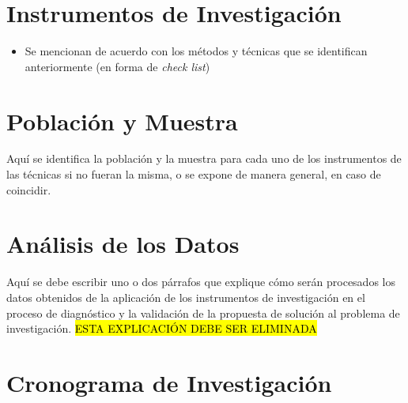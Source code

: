 \section{Instrumentos de Investigaci\'{o}n}
\label{cap2:sec:instrumentos_de_investigacion}

\begin{itemize}
    \item Se mencionan de acuerdo con los m\'{e}todos y t\'{e}cnicas que se identifican anteriormente (en 
forma de \textit{check list}) 
\end{itemize}

\section{Poblaci\'{o}n y Muestra}
\label{cap2:sec:poblacion_y_muestra}

Aqu\'{i} se identifica la poblaci\'{o}n y la muestra para cada uno de los instrumentos de las 
t\'{e}cnicas si no fueran la misma, o se expone de manera general, en caso de coincidir.


\section{An\'{a}lisis de los Datos}
\label{cap2:sec:analisis_de_los_datos}

Aqu\'{i} se debe escribir uno o dos p\'{a}rrafos que explique c\'{o}mo ser\'{a}n procesados los
datos obtenidos de la aplicaci\'{o}n de los instrumentos de investigaci\'{o}n en el proceso de 
diagn\'{o}stico y la validaci\'{o}n de la propuesta de soluci\'{o}n al problema de 
investigaci\'{o}n. \hl{ESTA EXPLICACI\'{O}N DEBE SER ELIMINADA}


\section{Cronograma de Investigaci\'{o}n}
\label{cap2:sec:cronograma_de_investigacion}

